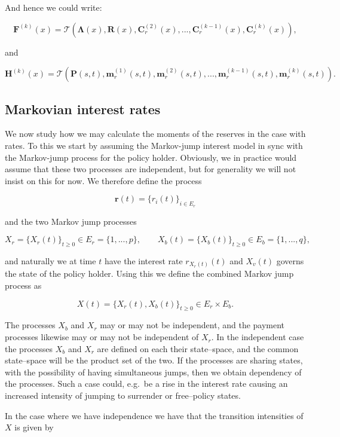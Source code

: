 \documentclass[a4paper,12pt,openany]{book}
\begin{document}
And hence we could write:

\[
\mathbf F^{(k)}(x)=\mathcal T(\mathbf \Lambda(x), \mathbf R(x) , \mathbf C^{(2)}_r(x) , ... , \mathbf C^{(k-1)}_r(x), \mathbf C^{(k)}_r(x)),
\]

and

\[
\mathbf H^{(k)}(x)=\mathcal T(\mathbf P(s,t) , \mathbf m_r^{(1)}(s,t) , \mathbf m_r^{(2)}(s,t), ...,\mathbf m_r^{(k-1)}(s,t) , \mathbf m_r^{(k)}(s,t)).
\]

\hypertarget{markovian-interest-rates}{%
\subsection{Markovian interest rates}\label{markovian-interest-rates}}

We now study how we may calculate the moments of the reserves in the case with rates. To this we start by assuming the Markov-jump interest model in sync with the Markov-jump process for the policy holder. Obviously, we in practice would assume that these two processes are independent, but for generality we will not insist on this for now. We therefore define the process

\[
\mathbf r(t)=\{r_i(t)\}_{i\in E_r}
\]

and the two Markov jump processes

\[
X_r=\{X_r(t)\}_{t\ge 0}\in E_r=\{1,...,p\},\qquad X_b(t)=\{X_b(t)\}_{t\ge 0}\in E_b=\{1,...,q\},
\]

and naturally we at time \(t\) have the interest rate \(r_{X_r(t)}(t)\) and \(X_v(t)\) governs the state of the policy holder. Using this we define the combined Markov jump process as

\[
X(t)=\{X_r(t),X_b(t)\}_{t\ge 0}\in E_r\times E_b.
\]

The processes \(X_b\) and \(X_r\) may or may not be independent, and the payment processes likewise may or may not be independent of \(X_r\). In the independent case the processes \(X_b\) and \(X_r\) are defined on each their state--space, and the common state--space will be the product set of the two. If the processes are sharing states, with the possibility of having simultaneous jumps, then we obtain dependency of the processes. Such a case could, e.g.~be a rise in the interest rate causing an increased intensity of jumping to surrender or free--policy states.

In the case where we have independence we have that the transition intensities of \(X\) is given by
\end{document}
